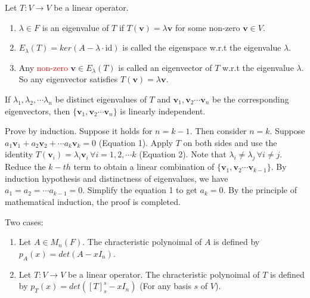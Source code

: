 \documentclass[12pt]{article}
\begin{document}
\begin{definition}
    Let $T:V\rightarrow V$ be a linear operator.
    \begin{enumerate}
        \item $\lambda\in F$ is an eigenvalue of $T$ if $T(\mathbf{v})=\lambda\mathbf{v}$ for some non-zero $\mathbf{v}\in V$.
        \item $E_\lambda(T)=ker(A-\lambda\cdot \text{id})$ is called the eigenspace w.r.t the eigenvalue $\lambda$.
        \item Any \textcolor{red}{non-zero} $\mathbf{v}\in E_\lambda(T)$ is called an eigenvector of $T$ w.r.t the eigenvalue $\lambda$. So any eigenvector satisfies $T(\mathbf{v})=\lambda\mathbf{v}$.
    \end{enumerate}
\end{definition}

\begin{theorem}
    If $\lambda_1, \lambda_2,\cdots\lambda_n$ be distinct eigenvalues of $T$ and $\mathbf{v}_1,\mathbf{v}_2\cdots\mathbf{v}_n$ be the corresponding eigenvectors,
    then $\{\mathbf{v}_1,\mathbf{v}_2\cdots\mathbf{v}_n\}$ is linearly independent.
\end{theorem}


\begin{pfbox}
    Prove by induction.
    Suppose it holds for $n=k-1$. Then consider $n=k$.
    Suppose $a_1\mathbf{v}_1 + a_2\mathbf{v}_2 + \cdots a_k\mathbf{v}_k = 0$ (Equation 1).
    Apply $T$ on both sides and use the identity $T(\mathbf{v}_i)=\lambda_i\mathbf{v}_i\,\forall i=1,2,\cdots k$ (Equation 2).
    Note that $\lambda_i\neq\lambda_j\,\forall i\neq j$.
    Reduce the $k-th$ term to obtain a linear combination of $\{\mathbf{v}_1,\mathbf{v}_2\cdots\mathbf{v}_{k-1}\}$. 
    By induction hypothesis and distinctness of eigenvalues, we have $a_1=a_2=\cdots a_{k-1}=0$. Simplify the equation 1 to get $a_k=0$.
    By the principle of mathematical induction, the proof is completed.
\end{pfbox}



\begin{definition}
    Two cases:
    \begin{enumerate}
        \item Let $A\in M_n(F)$. The chracteristic polynoimal of $A$ is defined by $p_A(x)=det(A-x I_n)$.
        \item Let $T:V\rightarrow V$ be a linear operator. The chracteristic polynoimal of $T$ is defined by $p_T(x)=det([T]^{s}_{s} -x I_n)$ (For any basis $s$ of $V$).
    \end{enumerate}
\end{definition}
\end{document}
